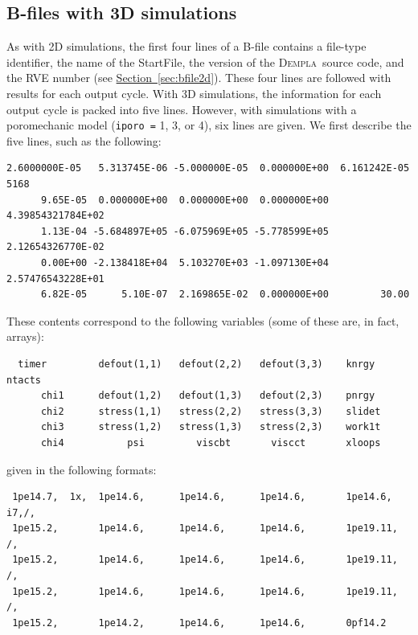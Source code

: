 \documentclass[letterpaper,11pt]{article}
\newcommand{\Dempla}{\textsc{Dempla}}
\begin{document}
\subsection{B-files with 3D simulations}\label{sec:bfiles3d}
As with 2D simulations,
the first four lines of a B-file
contains a file-type identifier, the name of the \textsf{StartFile},
the version of the \Dempla\ source code,
and the RVE number
(see \hyperref[sec:bfile2d]{Section~\ref*{sec:bfile2d}}).
These four lines are followed with results for each output cycle.
With 3D simulations, the information for each output cycle is packed
into five lines.
However, with simulations with a poromechanic model
(\texttt{iporo =} 1, 3, or 4),
six lines are given.
We first describe the five lines, such as the following:\\[-2ex]
\par
\footnotesize
\begin{verbatim}
2.6000000E-05   5.313745E-06 -5.000000E-05  0.000000E+00  6.161242E-05   5168
      9.65E-05  0.000000E+00  0.000000E+00  0.000000E+00  4.39854321784E+02
      1.13E-04 -5.684897E+05 -6.075969E+05 -5.778599E+05  2.12654326770E-02
      0.00E+00 -2.138418E+04  5.103270E+03 -1.097130E+04  2.57476543228E+01
      6.82E-05      5.10E-07  2.169865E-02  0.000000E+00         30.00
\end{verbatim}
\normalsize
\par
\rule{0ex}{3ex}These contents correspond to the following variables (some of these
are, in fact, arrays):\\[-2ex]
\footnotesize
\begin{verbatim}
  timer         defout(1,1)   defout(2,2)   defout(3,3)    knrgy       ntacts
      chi1      defout(1,2)   defout(1,3)   defout(2,3)    pnrgy
      chi2      stress(1,1)   stress(2,2)   stress(3,3)    slidet
      chi3      stress(1,2)   stress(1,3)   stress(2,3)    work1t
      chi4           psi         viscbt       viscct       xloops
\end{verbatim}
\normalsize
\rule{0ex}{3ex}given in the following formats:\\[-2ex]
\footnotesize
\begin{verbatim}
 1pe14.7,  1x,  1pe14.6,      1pe14.6,      1pe14.6,       1pe14.6,       i7,/,
 1pe15.2,       1pe14.6,      1pe14.6,      1pe14.6,       1pe19.11,         /,
 1pe15.2,       1pe14.6,      1pe14.6,      1pe14.6,       1pe19.11,         /,
 1pe15.2,       1pe14.6,      1pe14.6,      1pe14.6,       1pe19.11,         /,
 1pe15.2,       1pe14.2,      1pe14.6,      1pe14.6,       0pf14.2
\end{verbatim}
\end{document}
